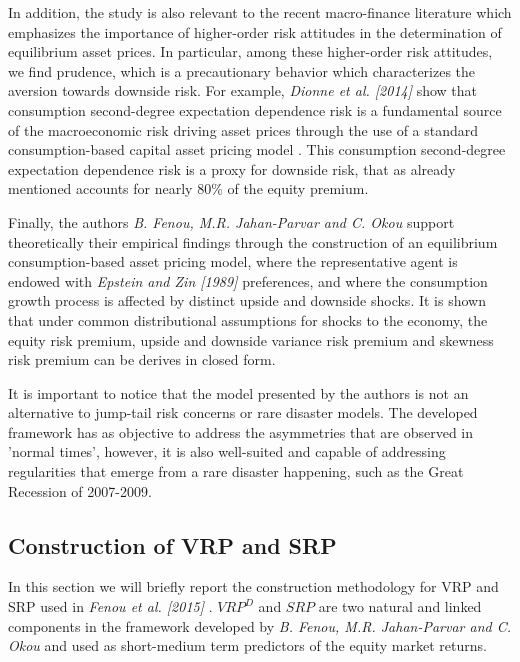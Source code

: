 \vspace{4mm}
In addition, the study is also relevant to the recent macro-finance literature which emphasizes the importance of higher-order risk attitudes in the determination of equilibrium asset prices. In particular, among these higher-order risk attitudes, we find prudence, which is a precautionary behavior which characterizes the aversion towards downside risk. For example, \textit{Dionne et al. [2014]} show that consumption second-degree expectation dependence risk is a fundamental source of the macroeconomic risk driving asset prices through the use of a standard consumption-based capital asset pricing model . This consumption second-degree expectation dependence risk is a proxy for downside risk, that as already mentioned accounts for nearly 80\% of the equity premium. 

\vspace{4mm}
Finally, the authors \textit{ B. Fenou, M.R. Jahan-Parvar and C. Okou} support theoretically their empirical findings through the construction of an equilibrium consumption-based asset pricing model, where the representative agent is endowed with \textit{Epstein and Zin [1989]} preferences, and where the consumption growth process is affected by distinct upside and downside shocks. It is shown that under common distributional assumptions for shocks to the economy, the equity risk premium, upside and downside variance risk premium and skewness risk premium can be derives in closed form. 

\vspace{4mm}
It is important to notice that the model presented by the authors is not an alternative to jump-tail risk concerns or rare disaster models. The developed framework has as objective to address the asymmetries that are observed in 'normal times', however, it is also well-suited and capable of addressing regularities that emerge from a rare disaster happening, such as the Great Recession of 2007-2009. 


\subsection{Construction of VRP and SRP }
In this section we will briefly report the construction methodology for VRP and SRP used in \textit{Fenou et al. [2015]} .
$VRP^D$ and $SRP$ are two natural and linked components in the framework developed by \textit{B. Fenou, M.R. Jahan-Parvar and C. Okou} and used as short-medium term predictors of the equity market returns. 

